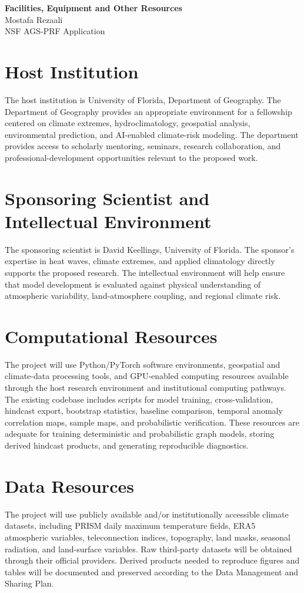 \documentclass[11pt,letterpaper]{article}
\begin{document}
\begin{center}
{\Large\bfseries Facilities, Equipment and Other Resources}\\[0.05in]
{\normalsize Mostafa Rezaali}\\
{\normalsize NSF AGS-PRF Application}
\end{center}
\vspace{-0.08in}
\section*{Host Institution}
The host institution is University of Florida, Department of Geography. The Department of Geography provides an appropriate environment for a fellowship centered on climate extremes, hydroclimatology, geospatial analysis, environmental prediction, and AI-enabled climate-risk modeling. The department provides access to scholarly mentoring, seminars, research collaboration, and professional-development opportunities relevant to the proposed work.

\section*{Sponsoring Scientist and Intellectual Environment}
The sponsoring scientist is David Keellings, University of Florida. The sponsor's expertise in heat waves, climate extremes, and applied climatology directly supports the proposed research. The intellectual environment will help ensure that model development is evaluated against physical understanding of atmospheric variability, land-atmosphere coupling, and regional climate risk.

\section*{Computational Resources}
The project will use Python/PyTorch software environments, geospatial and climate-data processing tools, and GPU-enabled computing resources available through the host research environment and institutional computing pathways. The existing codebase includes scripts for model training, cross-validation, hindcast export, bootstrap statistics, baseline comparison, temporal anomaly correlation maps, sample maps, and probabilistic verification. These resources are adequate for training deterministic and probabilistic graph models, storing derived hindcast products, and generating reproducible diagnostics.

\section*{Data Resources}
The project will use publicly available and/or institutionally accessible climate datasets, including PRISM daily maximum temperature fields, ERA5 atmospheric variables, teleconnection indices, topography, land masks, seasonal radiation, and land-surface variables. Raw third-party datasets will be obtained through their official providers. Derived products needed to reproduce figures and tables will be documented and preserved according to the Data Management and Sharing Plan.
\end{document}
